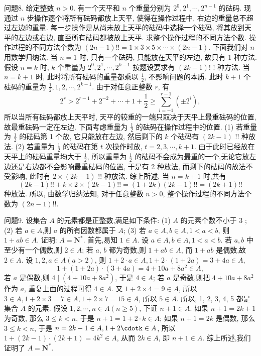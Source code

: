 问题8. 给定整数 $n>0$. 有一个天平和 $n$ 个重量分别为 $2^0, 2^1, \cdots, 2^{n-1}$ 的砝码.
现通过 $n$ 步操作逐个将所有砝码都放上天平, 使得在操作过程中, 右边的重量总不超过左边的重量.
每一步操作是从尚未放上天平的砝码中选择一个砝码, 将其放到天平的左边或右边, 直至所有砝码都被放上天平.
求整个操作过程的不同方法个数.
操作过程的不同方法个数为 $(2 n-1) ! !=1 \times 3 \times 5 \times \cdots \times(2 n-1)$.
下面我们对 $n$ 用数学归纳法.
当 $n=1$ 时, 只有一个砝码, 只能放在天平的左边, 故只有 1 种方法.
假设 $n=k$ 时, $k$ 个重量为 $2^0, 2^1, \cdots, 2^{k-1}$ 按题设要求有 $(2 k-1) !$ ! 种方法.
当 $n=k+1$ 时, 此时将所有砝码的重量都乘以 $\frac{1}{2}$, 不影响问题的本质.
此时 $k+1$ 个砝码的重量为 $\frac{1}{2}, 1,2, \cdots, 2^{k-1}$. 由于对任意正整数 $r$, 有
$$
2^r>2^{r-1}+2^{-2}+\cdots+1+\frac{1}{2} \geqslant \sum_{i=-1}^{r-1}\left( \pm 2^i\right),
$$
所以当所有砝码都放上天平时, 天平的较重的一端只取决于天平上最重砝码的位置, 故最重砝码一定在左边.
下面考虑重量为 $\frac{1}{2}$ 的砝码在操作过程中的位置.
(1) 若重量为 $\frac{1}{2}$ 的砝码第 1 个放, 它只能放在左边, 然后剩下的 $k$ 个砝码有 $(2 k-1)$ !! 种放法.
(2) 若重量为 $\frac{1}{2}$ 的砝码在第 $t$ 次操作时放, $t=2,3, \cdots, k+1$. 由于此时已经放在天平上的砝码重量均大于 $\frac{1}{2}$, 所以重量为 $\frac{1}{2}$ 的砝码不会成为最重的一个,无论它放左边还是右边都不会影响最重砝码的位置, 于是有 2 种放法, 而剩下的砝码的放法不受影响, 此时有 $2 \times(2 k-1)$ !! 种放法.
综上所述, 当 $n=k+1$ 时,共有
$$
(2 k-1) ! !+k \times 2 \times(2 k-1) ! !=(1+2 k)(2 k-1) ! !=(2 k+1) ! !
$$
种放法.
所以, 由数学归纳法知, 对于任意整数 $n>0$, 整个操作过程的不同方法个数为 $(2 n-1) ! !$.



问题9. 设集合 $A$ 的元素都是正整数,满足如下条件:
(1) $A$ 的元素个数不小于 3 ;
(2) 若 $a \in A$,则 $a$ 的所有因数都属于 $A$;
(3) 若 $a \in A, b \in A, 1<a<b$, 则 $1+a b \in A$.
证明: $A=\mathbf{N}^*$.
首先,易知 $1 \in A$.
设 $a \in A, b \in A, 1<a<b$. 若 $a, b$ 中至少有一个偶数,则 $2 \in A$; 若 $a$, $b$ 都为奇数,则 $1+a b \in A$, 而 $1+a b$ 是偶数,故 $2 \in A$.
设 $1,2, a \in A(a>2)$, 则 $1+2 \cdot a \in A, 1+2 \cdot(1+2 a)=3+4 a \in A$,
$$
1+(1+2 a) \cdot(3+4 a)=4+10 a+8 a^2 \in A,
$$
若 $a$ 是偶数,则 $4 \mid\left(4+10 a+8 a^2\right)$, 于是 $4 \in A$; 若 $a$ 是奇数,则把 $4+10 a+ 8 a^2$ 作为 $a$, 重复上面的过程可得 $4 \in A$.
又 $1+2 \times 4=9 \in A$, 所以 $3 \in A, 1+2 \times 3=7 \in A, 1+2 \times 7=15 \in A$, 所以 $5 \in A$.
所以, 1, 2, 3, 4, 5 都是集合 $A$ 的元素.
假设 $1,2, \cdots, n \in A(n \geqslant 5)$, 下证 $n+1 \in A$.
如果 $n+1=2 k+1$ 为奇数, 那么 $3 \leqslant k<n$, 于是 $n+1=1+2 \cdot k \in A$;
如果 $n+1=2 k$ 是偶数, 那么 $3 \leqslant k<n$, 于是 $n=2 k-1 \in A, 1+2 \cdotk \in A$, 所以 $1+(2 k-1) \cdot(2 k+1)=4 k^2 \in A$, 从而 $2 k \in A$, 即 $n+1 \in A$. 综上所述,我们证明了 $A=\mathbf{N}^*$.



